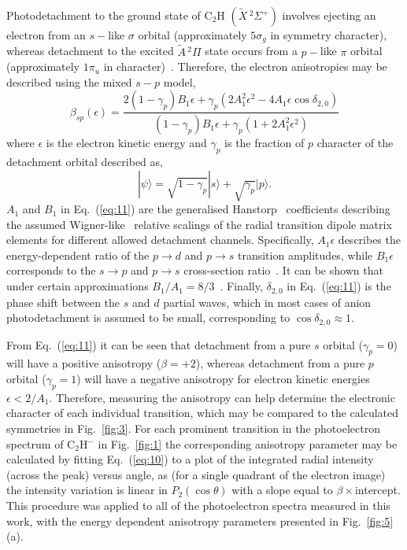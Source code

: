\documentclass[aip,graphicx]{revtex4-1}
\begin{document}
Photodetachment to the ground state of C$_2$H $(\tilde{X}\,^2\Sigma^+)$ involves ejecting an electron from an $s-$like $\sigma$ orbital (approximately $5\sigma_g$ in symmetry character), whereas detachment to the excited $\tilde{A}\,^2\Pi$ state occurs from a $p-$like $\pi$ orbital (approximately $1\pi_u$ in character)~\cite{gul21}. Therefore, the electron anisotropies may be described using the mixed $s-p$ model\cite{khu14},
\begin{equation}
\beta_{sp}(\epsilon) = \frac{2(1-\gamma_p)B_1\epsilon + \gamma_p(2A_1^2\epsilon^2-4A_1\epsilon\cos\delta_{2,0})}
{(1-\gamma_p)B_1\epsilon+\gamma_p(1+2A_1^2\epsilon^2)}
\label{eq:11}
\end{equation}
where $\epsilon$ is the electron kinetic energy and $\gamma_p$ is the fraction of $p$ character of the detachment orbital described as,
\begin{equation}
|\psi\rangle = \sqrt{1-\gamma_p}|s\rangle + \sqrt{\gamma_p}|p\rangle.
\label{eq:12}
\end{equation}
$A_1$ and $B_1$ in Eq.~(\ref{eq:11}) are the generalised Hanstorp~\cite{han89} coefficients describing the assumed Wigner-like~\cite{wig48} relative scalings of the radial transition dipole matrix elements for different allowed detachment channels. Specifically, $A_1\epsilon$ describes the energy-dependent ratio of the $p\rightarrow d$ and $p\rightarrow s$ transition amplitudes, while $B_1\epsilon$ corresponds to the $s\rightarrow p$ and $p\rightarrow s$ cross-section ratio~\cite{khu14}. It can be shown that under certain approximations $B_1/A_1 = 8/3$~\cite{san13}. Finally, $\delta_{2,0}$ in Eq.~(\ref{eq:11}) is the phase shift between the $s$ and $d$ partial waves, which in most cases of anion photodetachment is assumed to be small, corresponding to $\cos\delta_{2,0}\approx1$.

From Eq.~(\ref{eq:11}) it can be seen that detachment from a pure $s$ orbital ($\gamma_p=0$) will have a positive anisotropy ($\beta = +2$), whereas detachment from a pure $p$ orbital ($\gamma_p=1$) will have a negative anisotropy for electron kinetic energies $\epsilon < 2/A_1$. Therefore, measuring the anisotropy can help determine the electronic character of each individual transition, which may be compared to the calculated symmetries in Fig.~\ref{fig:3}. For each prominent transition in the photoelectron spectrum of C$_2$H$^-$ in Fig.~\ref{fig:1} the corresponding anisotropy parameter may be calculated by fitting Eq.~(\ref{eq:10}) to a plot of the integrated radial intensity (across the peak) versus angle, as (for a single quadrant of the electron image) the intensity variation is linear in $P_2(\cos\theta)$ with a slope equal to $\beta\times$intercept. This procedure was applied to all of the photoelectron spectra measured in this work, with the energy dependent anisotropy parameters presented in Fig.~\ref{fig:5}(a).
\end{document}
